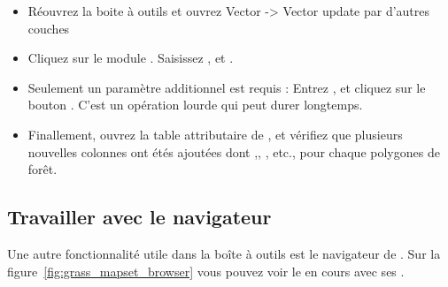 {\begin{itemize}[label=--]
\item Réouvrez la boite à outils \grass et ouvrez Vector -> Vector update par d'autres couches
\item Cliquez sur le module . Saisissez , et .
\item Seulement un paramètre additionnel est requis : Entrez  , et cliquez sur le bouton . C'est un opération lourde qui peut durer longtemps.
\item Finallement, ouvrez la table attributaire de , et vérifiez que plusieurs nouvelles colonnes ont étés ajoutées dont ,, , etc., pour chaque polygones de forêt.
\end{itemize}

\subsection{Travailler avec le navigateur \grass} 

Une autre fonctionnalité utile dans la boîte à outils \grass est le navigateur de  \grass. Sur la figure~\ref{fig:grass_mapset_browser}
vous pouvez voir le  en cours  avec ses .

}
